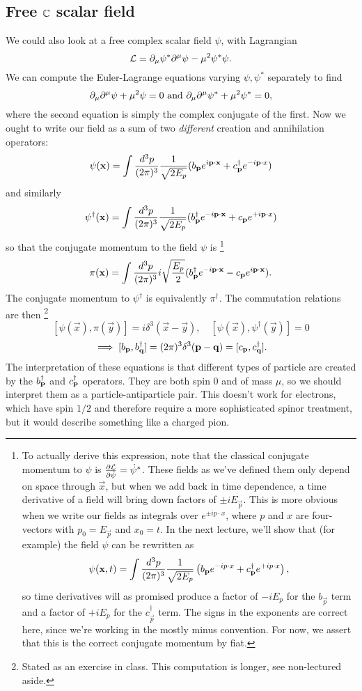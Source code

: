 \subsection*{Free $\mathbb{C}$ scalar field} We could also look at a free complex scalar field $\psi$, with Lagrangian
$$\mathcal L = \partial_\mu \psi^* \partial^\mu \psi - \mu^2 \psi^* \psi.$$
We can compute the Euler-Lagrange equations varying $\psi,\psi^*$ separately to find
$$\partial_\mu \partial^\mu \psi + \mu^2 \psi=0\text{ and }\partial_\mu \partial^\mu \psi^*+\mu^2 \psi^*=0,$$
where the second equation is simply the complex conjugate of the first.
Now we ought to write our field as a sum of two \emph{different} creation and annihilation operators:
$$\psi(\boldsymbol{\mathbf{x}})=\int \frac{d^3p}{(2\pi)^3}\frac{1}{\sqrt{2E_p}} (b_{\boldsymbol{\mathbf{p}}} e^{i \boldsymbol{\mathbf{p}} \cdot \boldsymbol{\mathbf{x}}} + c_{\boldsymbol{\mathbf{p}}}^\dagger e^{-i \boldsymbol{\mathbf{p}} \cdot x})$$
and similarly
$$\psi^\dagger (\boldsymbol{\mathbf{x}})=\int \frac{d^3p}{(2\pi)^3} \frac{1}{\sqrt{2E_p}} (b_{\boldsymbol{\mathbf{p}}}^\dagger e^{-i \boldsymbol{\mathbf{p}} \cdot \boldsymbol{\mathbf{x}}} + c_{\boldsymbol{\mathbf{p}}} e^{+i \boldsymbol{\mathbf{p}} \cdot x})$$
so that the conjugate momentum to the field $\psi$ is%
    \footnote{To actually derive this expression, note that the classical conjugate momentum to $\psi$ is $\frac{\partial \mathcal L}{\partial \dot \psi}=\dot \psi^*$. These fields as we've defined them only depend on space through $\vec x$, but when we add back in time dependence, a time derivative of a field will bring down factors of $\pm iE_{\vec p}$. This is more obvious when we write our fields as integrals over $e^{\pm ip \cdot x}$, where $p$ and $x$ are four-vectors with $p_0=E_{\vec p}$ and $x_0=t$. In the next lecture, we'll show that (for example) the field $\psi$ can be rewritten as
    \begin{equation*}
        \psi(\boldsymbol{\mathbf{x}},t) = \int \frac{d^3p}{(2\pi)^3} \frac{1}{\sqrt{2E_p}} \left( b_{\boldsymbol{\mathbf{p}}} e^{-i p\cdot x}+c_{\boldsymbol{\mathbf{p}}}^\dagger e^{+i p\cdot x}\right),
    \end{equation*}
    so time derivatives will as promised produce a factor of $-iE_p$ for the $b_{\vec p}$ term and a factor of $+iE_p$ for the $c_{\vec p}^\dagger$ term.
    The signs in the exponents are correct here, since we're working in the mostly minus convention. For now, we assert that this is the correct conjugate momentum by fiat.}
$$\pi(\boldsymbol{\mathbf{x}})=\int \frac{d^3p}{(2\pi)^3} i\sqrt{\frac{E_p}{2}} (b_{\boldsymbol{\mathbf{p}}}^\dagger e^{-i \boldsymbol{\mathbf{p}} \cdot \boldsymbol{\mathbf{x}}}-c_{\boldsymbol{\mathbf{p}}} e^{i \boldsymbol{\mathbf{p}} \cdot \boldsymbol{\mathbf{x}}}).$$
The conjugate momentum to $\psi^\dagger$ is equivalently $\pi^\dagger$. The commutation relations are then%
    \footnote{Stated as an exercise in class. This computation is longer, see non-lectured aside.}
$$[\psi(\vec x), \pi(\vec y)]=i\delta^3(\vec x - \vec y), \quad 
[\psi(\vec x),\psi^\dagger(\vec y)]=0$$
$$\implies [b_{\boldsymbol{\mathbf{p}}},b_{\boldsymbol{\mathbf{q}}}^\dagger]=(2\pi)^3 \delta^3 (\boldsymbol{\mathbf{p}} - \boldsymbol{\mathbf{q}})=[c_{\boldsymbol{\mathbf{p}}},c_{\boldsymbol{\mathbf{q}}}^\dagger].$$
The interpretation of these equations is that different types of particle are created by the $b_{\boldsymbol{\mathbf{p}}}^\dagger$ and $c_{\boldsymbol{\mathbf{p}}}^\dagger$ operators. They are both spin $0$ and of mass $\mu$, so we should interpret them as a particle-antiparticle pair. This doesn't work for electrons, which have spin $1/2$ and therefore require a more sophisticated spinor treatment, but it would describe something like a charged pion.

